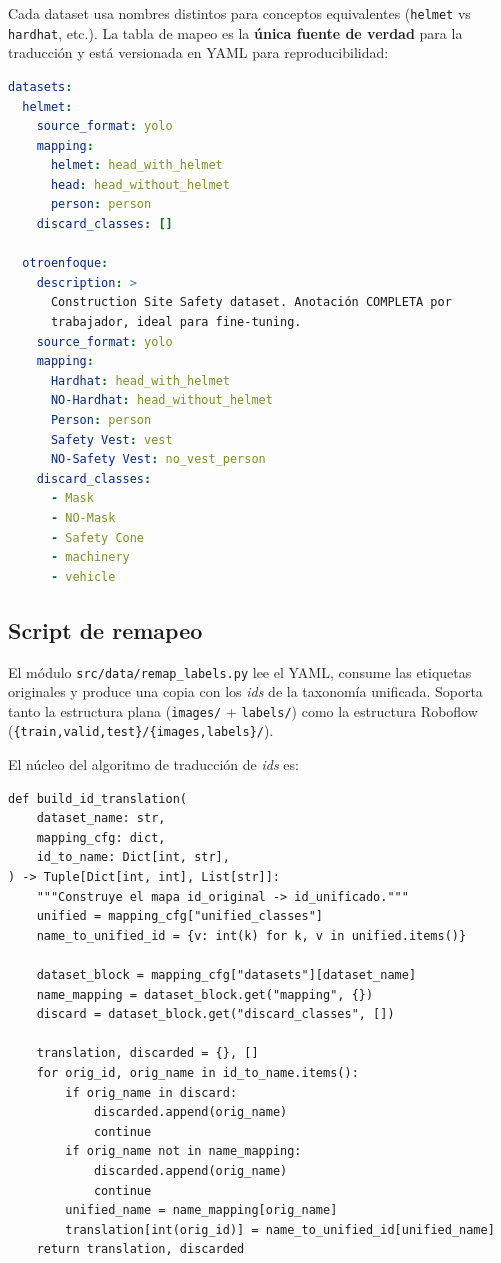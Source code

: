 \documentclass[11pt,a4paper]{article}
\begin{document}
Cada dataset usa nombres distintos para conceptos equivalentes
(\texttt{helmet} vs \texttt{hardhat}, etc.). La tabla de mapeo es la
\textbf{única fuente de verdad} para la traducción y está versionada
en YAML para reproducibilidad:

\begin{lstlisting}[language=yaml, caption={Fragmento de \texttt{configs/class\_mapping.yaml}.}]
datasets:
  helmet:
    source_format: yolo
    mapping:
      helmet: head_with_helmet
      head: head_without_helmet
      person: person
    discard_classes: []

  otroenfoque:
    description: >
      Construction Site Safety dataset. Anotación COMPLETA por
      trabajador, ideal para fine-tuning.
    source_format: yolo
    mapping:
      Hardhat: head_with_helmet
      NO-Hardhat: head_without_helmet
      Person: person
      Safety Vest: vest
      NO-Safety Vest: no_vest_person
    discard_classes:
      - Mask
      - NO-Mask
      - Safety Cone
      - machinery
      - vehicle
\end{lstlisting}

\subsection{Script de remapeo}

El módulo \texttt{src/data/remap\_labels.py} lee el YAML, consume las
etiquetas originales y produce una copia con los \textit{ids} de la
taxonomía unificada. Soporta tanto la estructura plana
(\texttt{images/} + \texttt{labels/}) como la estructura Roboflow
(\texttt{\{train,valid,test\}/\{images,labels\}/}).

El núcleo del algoritmo de traducción de \textit{ids} es:

\begin{lstlisting}[caption={\texttt{build\_id\_translation()} de \texttt{remap\_labels.py}.}]
def build_id_translation(
    dataset_name: str,
    mapping_cfg: dict,
    id_to_name: Dict[int, str],
) -> Tuple[Dict[int, int], List[str]]:
    """Construye el mapa id_original -> id_unificado."""
    unified = mapping_cfg["unified_classes"]
    name_to_unified_id = {v: int(k) for k, v in unified.items()}

    dataset_block = mapping_cfg["datasets"][dataset_name]
    name_mapping = dataset_block.get("mapping", {})
    discard = dataset_block.get("discard_classes", [])

    translation, discarded = {}, []
    for orig_id, orig_name in id_to_name.items():
        if orig_name in discard:
            discarded.append(orig_name)
            continue
        if orig_name not in name_mapping:
            discarded.append(orig_name)
            continue
        unified_name = name_mapping[orig_name]
        translation[int(orig_id)] = name_to_unified_id[unified_name]
    return translation, discarded
\end{lstlisting}
\end{document}
